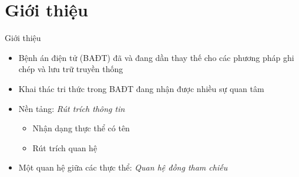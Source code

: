 \section{Giới thiệu}
\begin{frame}{Giới thiệu}
\putlogo
\begin{itemize}
	\item Bệnh án điện tử (BAĐT) đã và đang dần thay thế cho các phương pháp ghi chép và lưu trữ truyền thống
	\item Khai thác tri thức trong BAĐT đang nhận được nhiều sự quan tâm
	\item Nền tảng: \emph{Rút trích thông tin}
	\begin{itemize}
		\item Nhận dạng thực thể có tên
		\item Rút trích quan hệ
	\end{itemize}
	\item Một quan hệ giữa các thực thể: \emph{Quan hệ đồng tham chiếu}
\end{itemize}
\end{frame}
